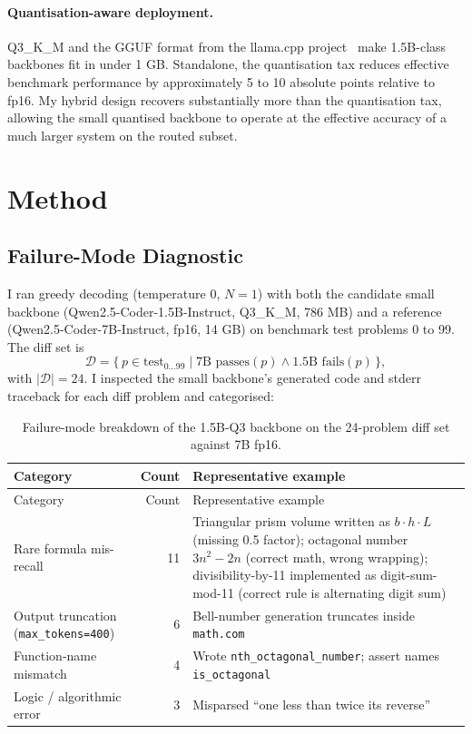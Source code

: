 \documentclass[11pt,a4paper]{article}
\begin{document}
\paragraph{Quantisation-aware deployment.}
Q3\_K\_M and the GGUF format from the llama.cpp project~\cite{llamacpp} make 1.5B-class backbones fit in under 1 GB. Standalone, the quantisation tax reduces effective benchmark performance by approximately 5 to 10 absolute points relative to fp16. My hybrid design recovers substantially more than the quantisation tax, allowing the small quantised backbone to operate at the effective accuracy of a much larger system on the routed subset.

\section{Method}
\label{sec:method}

\subsection{Failure-Mode Diagnostic}
\label{sec:diag}

I ran greedy decoding (temperature 0, $N=1$) with both the candidate small backbone (Qwen2.5-Coder-1.5B-Instruct, Q3\_K\_M, 786 MB) and a reference (Qwen2.5-Coder-7B-Instruct, fp16, 14 GB) on benchmark test problems 0 to 99. The diff set is
\[
\mathcal{D} = \{\, p \in \text{test}_{0\ldots99} \mid \text{7B passes}(p) \land \text{1.5B fails}(p)\,\},
\]
with $|\mathcal{D}| = 24$. I inspected the small backbone's generated code and stderr traceback for each diff problem and categorised:

\begin{longtable}{p{4.5cm}rp{7.5cm}}
\caption{Failure-mode breakdown of the 1.5B-Q3 backbone on the 24-problem diff set against 7B fp16.}\label{tab:failures}\\
\toprule
Category & Count & Representative example \\
\midrule
\endfirsthead
\toprule
Category & Count & Representative example \\
\midrule
\endhead
Rare formula mis-recall & 11 & Triangular prism volume written as $b \cdot h \cdot L$ (missing 0.5 factor); octagonal number $3n^2 - 2n$ (correct math, wrong wrapping); divisibility-by-11 implemented as digit-sum-mod-11 (correct rule is alternating digit sum) \\
Output truncation (\texttt{max\_tokens=400}) & 6 & Bell-number generation truncates inside \texttt{math.com} \\
Function-name mismatch & 4 & Wrote \texttt{nth\_octagonal\_number}; assert names \texttt{is\_octagonal} \\
Logic / algorithmic error & 3 & Misparsed ``one less than twice its reverse'' \\
\bottomrule
\end{longtable}
\end{document}
